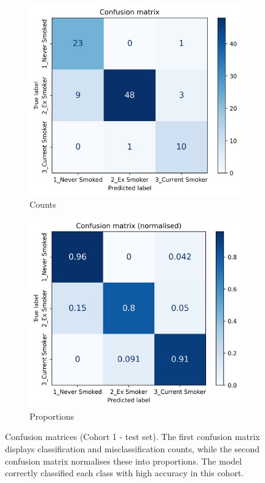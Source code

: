 \documentclass{article} %
\begin{document}
\begin{figure}[p]
    \centering
    \begin{subfigure}{0.49\linewidth}
        \centering
        \includegraphics[width=\linewidth]{cohort1/test_confusion_matrix.png}
        \caption{Counts}
    \end{subfigure}
    \hfill
    \begin{subfigure}{0.49\linewidth}
        \centering
        \includegraphics[width=\linewidth]{cohort1/test_confusion_matrix_normalised.png}
        \caption{Proportions}
    \end{subfigure}
    \caption[Confusion matrices (Cohort 1)]{Confusion matrices (Cohort 1 - test set). The first confusion matrix displays classification and misclassification counts, while the second confusion matrix normalises these into proportions. The model correctly classified each class with high accuracy in this cohort.}
    \label{fig:cohort1-confusion-matrix}
\end{figure}
\end{document}
